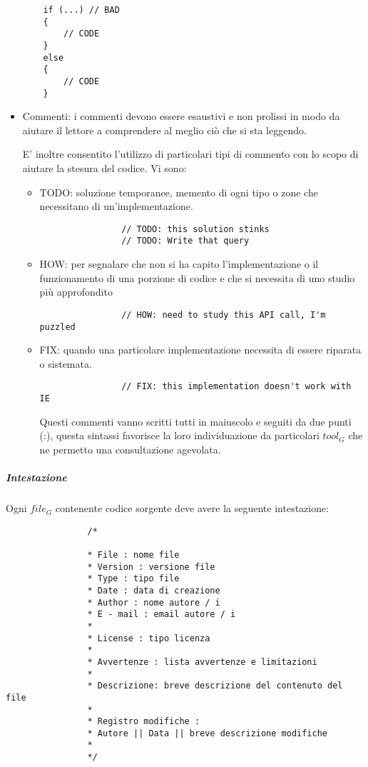 \begin{itemize}
\begin{lstlisting}
	if (...) // BAD
	{
	 	// CODE
	}
	else 
	{
		// CODE
	}
\end{lstlisting}

			\item Commenti: i commenti devono essere esaustivi e non prolissi in modo da aiutare il lettore a comprendere al meglio ciò che si sta leggendo.
			
			
			E' inoltre consentito l'utilizzo di particolari tipi di commento con lo scopo di aiutare la stesura del codice. Vi sono:
			\begin{itemize}
				\item TODO: soluzione temporanee, memento di ogni tipo o zone che necessitano di un'implementazione.
				\begin{lstlisting}
				// TODO: this solution stinks
				// TODO: Write that query
				\end{lstlisting}
				
				\item HOW: per segnalare che non si ha capito l'implementazione o il funzionamento di una porzione di codice e che si necessita di uno studio più approfondito
				\begin{lstlisting}
				// HOW: need to study this API call, I'm puzzled
				\end{lstlisting}
				
				\item FIX: quando una particolare implementazione necessita di essere riparata o sistemata.
				\begin{lstlisting}
				// FIX: this implementation doesn't work with IE
				\end{lstlisting}
				Questi commenti vanno scritti tutti in maiuscolo e seguiti da due punti (:), questa sintassi favorisce la loro individuazione da particolari $tool_G$ che ne permetto una consultazione agevolata.
			\end{itemize}

			\end{itemize}
			\subparagraph{Intestazione}
			Ogni $file_G$ contenente codice sorgente deve avere la seguente intestazione:
			\begin{lstlisting}
				/*
				
				* File : nome file
				* Version : versione file
				* Type : tipo file
				* Date : data di creazione
				* Author : nome autore / i
				* E - mail : email autore / i
				*
				* License : tipo licenza				
				*				
				* Avvertenze : lista avvertenze e limitazioni
				*
				* Descrizione: breve descrizione del contenuto del file
				*
				* Registro modifiche :
				* Autore || Data || breve descrizione modifiche
				*
				*/
			\end{lstlisting}
